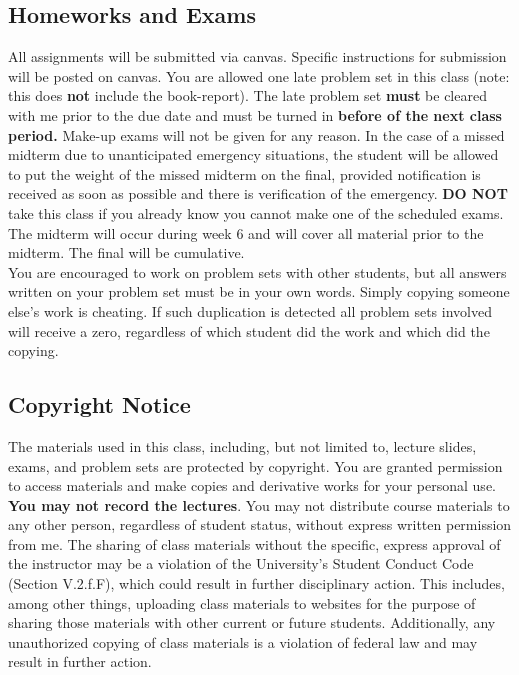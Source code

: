 \documentclass[11pt]{article}
\begin{document}
	
	
	\subsection*{Homeworks and Exams}

All assignments will be submitted via canvas. Specific instructions for submission will be posted on canvas. You are allowed one late problem set in this class (note: this does \textbf{not} include the book-report). The late problem set \textbf{must} be cleared with me prior to the due date and must be turned in \textbf{before of the next class period.} Make-up exams will not be given for any reason. In the case of a missed midterm due to unanticipated emergency situations, the student will be allowed to put the weight of the missed midterm on the final, provided notification is received as soon as possible and there is verification of the emergency. \textbf{DO NOT} take this class if you already know you cannot make one of the scheduled exams. The midterm will occur during week 6 and will cover all material prior to the midterm. The final will be cumulative.\\

	
	
	
	
	\noindent You are encouraged to work on problem sets with other students, but all answers written on your problem set must be in your own words. Simply copying someone else’s work is cheating. If such duplication is detected all problem sets involved will receive a zero, regardless of which student did the work and which did the copying.

	
	\subsection*{Copyright Notice}
	
The materials used in this class, including, but not limited to, lecture slides, exams, and problem sets are protected by copyright. You are granted permission to access materials and make copies and derivative works for your personal use. \textbf{You may not record the lectures}. You may not distribute course materials to any other person, regardless of student status, without express written permission from me. The sharing of class materials without the specific, express approval of the instructor may be a violation of the University’s Student Conduct Code (Section V.2.f.F), which could result in further disciplinary action. This includes, among other things, uploading class materials to websites for the purpose of sharing those materials with other current or future students. Additionally, any unauthorized copying of class materials is a violation of federal law and may result in further action.
\end{document}
